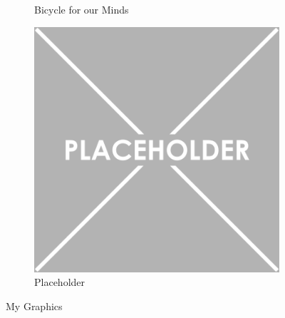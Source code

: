 \begin{landscape}
\begin{figure}
\begin{subfigure}[b]{0.3\textwidth}
    \caption{Bicycle for our Minds}
    \label{fig:Bicycle-for-our-Minds}
  \end{subfigure}             
  \begin{subfigure}[b]{0.3\textwidth}
    \includegraphics[width=\textwidth]{Placeholder}
    \caption{Placeholder}
    \label{fig:aPlaceholder}
  \end{subfigure}
  \caption{My Graphics}
  \label{fig:myGraphics}
\end{figure}

\end{landscape}
